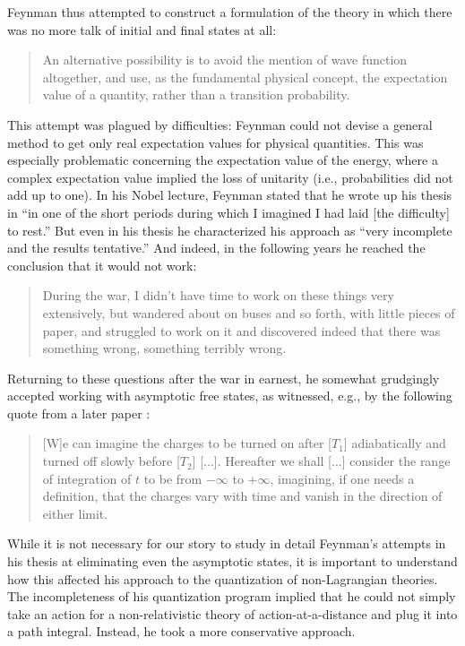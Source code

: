 \documentclass[12pt,a4paper]{article}
\begin{document}
Feynman thus attempted to construct a formulation of the theory in which there was no more talk of initial and final states at all:

\begin{quote}
An alternative possibility is to avoid the mention of wave function altogether, and use, as the fundamental physical concept, the expectation value of a quantity, rather than a transition probability.
\end{quote}

This attempt was plagued by difficulties: Feynman could not devise a general method to get only real expectation values for physical quantities. This was especially problematic concerning the expectation value of the energy, where a complex expectation value implied the loss of unitarity (i.e., probabilities did not add up to one). In his Nobel lecture, Feynman stated that he wrote up his thesis in ``in one of the short periods during which I imagined I had laid [the difficulty] to rest.'' But even in his thesis he characterized his approach as ``very incomplete and the results tentative.'' And indeed, in the following years he reached the conclusion that it would not work:

\begin{quote}
During the war, I didn't have time to work on these things very extensively, but wandered about on buses and so forth, with little pieces of paper, and struggled to work on it and discovered indeed that there was something wrong, something terribly wrong.
\end{quote}

Returning to these questions after the war in earnest, he somewhat grudgingly accepted working with asymptotic free states, as witnessed, e.g., by the following quote from a later paper \citep{feynman_1950_mathematical}:

 \begin{quote}
 [W]e can imagine the charges to be turned on after [$T_1$] adiabatically and turned off slowly before [$T_2$] [...]. Hereafter we shall [...] consider the range of integration of $t$ to be from $- \infty$ to $+ \infty$, imagining, if one needs a definition, that the charges vary with time and vanish in the direction of either limit.
 \end{quote}
 
 While it is not necessary for our story to study in detail Feynman's attempts in his thesis at eliminating even the asymptotic states, it is important to understand how this affected his approach to the quantization of non-Lagrangian theories. The incompleteness of his quantization program implied that he could not simply take an action for a non-relativistic theory of action-at-a-distance and plug it into a path integral. Instead, he took a more conservative approach.
 
\end{document}
